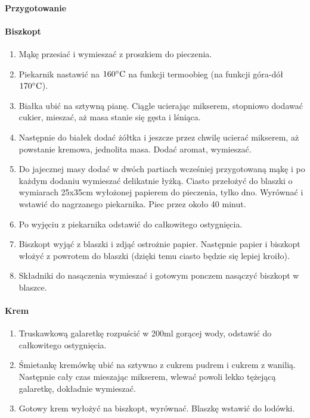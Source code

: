 \documentclass{article}
\begin{document}
    \paragraph{Przygotowanie}
    \paragraph{Biszkopt}
    \begin{enumerate}
        \item Mąkę przesiać i wymieszać z proszkiem do pieczenia.
        \item Piekarnik nastawić na $160\celsius$ na funkcji termoobieg (na funkcji
            góra-dół $170\celsius$).
        \item Białka ubić na sztywną pianę. Ciągle ucierając mikserem, stopniowo
            dodawać cukier, mieszać, aż masa stanie się gęsta i lśniąca.
        \item Następnie do białek dodać żółtka i jeszcze przez chwilę ucierać
            mikserem, aż powstanie kremowa, jednolita masa. Dodać aromat,
            wymieszać.
        \item Do jajecznej masy dodać w dwóch partiach wcześniej przygotowaną
            mąkę i po każdym dodaniu wymieszać delikatnie łyżką. Ciasto
            przełożyć do blaszki o wymiarach 25x35cm wyłożonej papierem do
            pieczenia, tylko dno. Wyrównać i wstawić do nagrzanego piekarnika.
            Piec przez około 40 minut.
        \item Po wyjęciu z piekarnika odstawić do całkowitego
            ostygnięcia.
        \item Biszkopt wyjąć z blaszki i zdjąć ostrożnie papier.  Następnie
            papier i biszkopt włożyć z powrotem do blaszki (dzięki temu ciasto
            będzie się lepiej kroiło).
        \item Składniki do nasączenia wymieszać i gotowym ponczem nasączyć
            biszkopt w blaszce.
    \end{enumerate}
    \paragraph{Krem}
    \begin{enumerate}
        \item Truskawkową galaretkę rozpuścić w 200ml gorącej wody, odstawić do
            całkowitego ostygnięcia.
        \item Śmietankę kremówkę ubić na sztywno z cukrem pudrem i cukrem z
            wanilią. Następnie cały czas mieszając mikserem, wlewać powoli lekko
            tężejącą galaretkę, dokładnie wymieszać.
        \item Gotowy krem wyłożyć na biszkopt, wyrównać. Blaszkę wstawić do
            lodówki.
    \end{enumerate}
\end{document}
